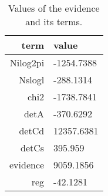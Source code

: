 \begin{table*}\caption{Values of the evidence and its terms.}\begin{center}\begin{tabular}{ r l } term & value \\
\hline Nilog2pi & -1254.7388 \\ 
Nslogl & -288.1314 \\ 
chi2 & -1738.7841 \\ 
detA & -370.6292 \\ 
detCd & 12357.6381 \\ 
detCs & 395.959 \\ 
evidence & 9059.1856 \\ 
reg & -42.1281 \\ 
\hline\end{tabular}\end{center}\label{tab:2}\end{table*}